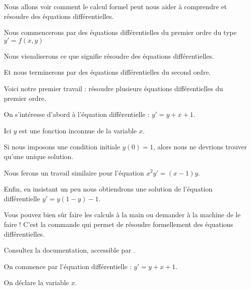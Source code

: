 






\debuttexte


\diapo

Nous allons voir comment le calcul formel peut nous aider à comprendre et résoudre des équations différentielles.


\change

\change

Nous commencerons par des équations différentielles du premier ordre du type 
 $y' = f(x,y)$

\change
Nous visualiserons ce que signifie résoudre des équations différentielles.

\change
Et nous terminerons par des équations différentielles du second ordre.


\diapo


Voici notre premier travail : résoudre plusieurs équations différentielles du premier ordre.

On s'intéresse d'abord à l'équation différentielle :
  $y' = y + x + 1.$
  
  Ici $y$ est une fonction inconnue de la variable $x$.

Si %
nous imposons une condition initiale $y(0)=1$, alors nous ne devrions trouver qu'une unique solution.
  

Nous ferons un travail similaire pour l'équation $x^2y' = (x-1)y$.

Enfin, en insistant un peu  nous obtiendrons une solution de 
l'équation différentielle $y'= y(1-y) - 1.$

\change
Vous pouvez bien sûr faire les calculs à la main ou demander à la machine de le faire !
C'est la commande  qui permet de résoudre formellement des équations différentielles.


Consultez la documentation, accessible par .



\diapo 


On commence par l'équation différentielle :
  $y' = y + x + 1.$

\change
On déclare la variable $x$. 

